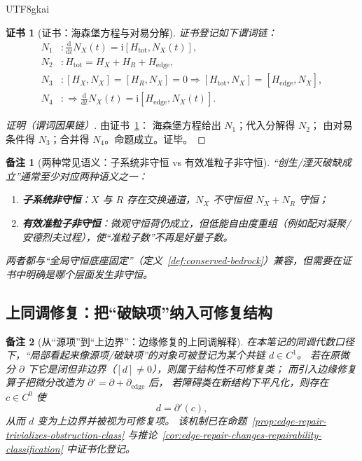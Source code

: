 \documentclass[12pt]{article}
\newtheorem{remark}{备注}[section]
\newtheorem{Certificate}{证书}[section]
\begin{document}
\begin{CJK*}{UTF8}{gkai}
\begin{Certificate}[证书：海森堡方程与对易分解]
\label{cert:subsystem-number-nonconservation-witnessed-by-edge}
证书登记如下谓词链：
\[
\begin{aligned}
  N_1 &: \frac{\mathrm{d}}{\mathrm{d}t}N_X(t)=\mathrm{i}[H_{\mathrm{tot}},N_X(t)],\\
  N_2 &: H_{\mathrm{tot}}=H_X+H_R+H_{\mathrm{edge}},\\
  N_3 &: [H_X,N_X]=[H_R,N_X]=0\Rightarrow [H_{\mathrm{tot}},N_X]=[H_{\mathrm{edge}},N_X],\\
  N_4 &: \Rightarrow \frac{\mathrm{d}}{\mathrm{d}t}N_X(t)=\mathrm{i}[H_{\mathrm{edge}},N_X(t)].
\end{aligned}
\]
\end{Certificate}

\begin{proof}[证明（谓词因果链）]
由证书~\ref{cert:subsystem-number-nonconservation-witnessed-by-edge}：
海森堡方程给出 $N_1$；代入分解得 $N_2$；
由对易条件得 $N_3$；合并得 $N_4$。命题成立。证毕。
\end{proof}

\begin{remark}[两种常见语义：子系统非守恒 vs 有效准粒子非守恒]
“创生/湮灭破缺成立”通常至少对应两种语义之一：
\begin{enumerate}
  \item \textbf{子系统非守恒}：$X$ 与 $R$ 存在交换通道，$N_X$ 不守恒但 $N_X+N_R$ 守恒；
  \item \textbf{有效准粒子非守恒}：微观守恒荷仍成立，但低能自由度重组（例如配对凝聚/安德烈夫过程），使“准粒子数”不再是好量子数。
\end{enumerate}
两者都与“全局守恒底座固定”（定义~\ref{def:conserved-bedrock}）兼容，但需要在证书中明确是哪个层面发生非守恒。
\end{remark}

\subsection{上同调修复：把“破缺项”纳入可修复结构}
\label{sec:cohomology-repair-closes-breaking}

\begin{remark}[从“源项”到“上边界”：边缘修复的上同调解释]
在本笔记的同调代数口径下，“局部看起来像源项/破缺项”的对象可被登记为某个共链 $d\in C^1$。
若在原微分 $\partial$ 下它是闭但非边界（$[d]\neq 0$），则属于结构性不可修复类；
而引入边缘修复算子把微分改造为 $\partial'=\partial+\partial_{\mathrm{edge}}$ 后，
若障碍类在新结构下平凡化，则存在 $c\in C^0$ 使
\[
  d=\partial'(c),
\]
从而 $d$ 变为上边界并被视为可修复项。
该机制已在命题~\ref{prop:edge-repair-trivializes-obstruction-class} 与推论~\ref{cor:edge-repair-changes-repairability-classification} 中证书化登记。
\end{remark}


\end{CJK*}
\end{document}
